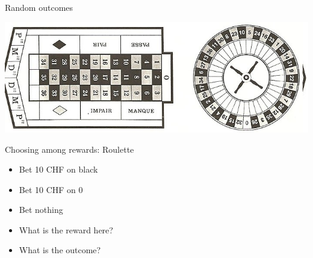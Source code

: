 \documentclass[smaller]{beamer}
\begin{document}
\begin{frame}[label={sec:orgd93decf}]{Random outcomes}
\begin{center}
\includegraphics[width=.9\linewidth]{./figures/roulette.jpg}
\end{center}


\begin{block}{Choosing among rewards: Roulette}
\begin{itemize}
\item\relax [A] Bet 10 CHF on black
\item\relax [B] Bet 10 CHF on 0
\item\relax [C] Bet nothing

\item What is the reward here?
\item What is the outcome?
\end{itemize}
\end{block}
\end{frame}
\end{document}
